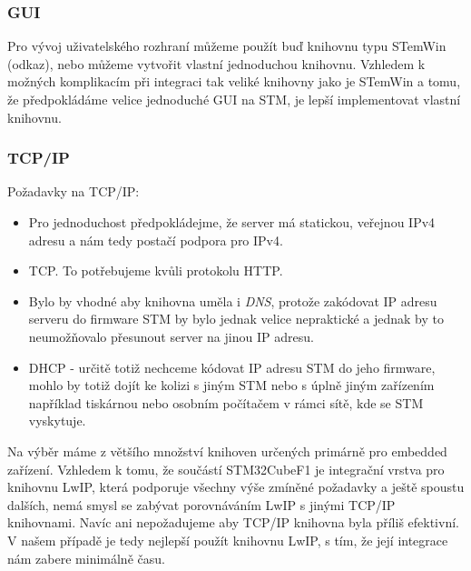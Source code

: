\subsubsection{GUI}
Pro vývoj uživatelského rozhraní můžeme použít buď knihovnu typu STemWin (odkaz), nebo můžeme
vytvořit vlastní jednoduchou knihovnu.
Vzhledem k možných komplikacím při integraci tak veliké knihovny jako je STemWin a tomu, že
předpokládáme velice jednoduché GUI na STM, je lepší implementovat vlastní knihovnu.

\subsubsection{TCP/IP}
Požadavky na TCP/IP:
\begin{itemize}
  \item Pro jednoduchost předpokládejme, že server má statickou, veřejnou IPv4 adresu a nám tedy
    postačí podpora pro IPv4.
  \item TCP. To potřebujeme kvůli protokolu HTTP.
  \item Bylo by vhodné aby knihovna uměla i \emph{DNS}, protože zakódovat IP adresu serveru do firmware
    STM by bylo jednak velice nepraktické a jednak by to neumožňovalo přesunout server na jinou
    IP adresu.
  \item DHCP - určitě totiž nechceme kódovat IP adresu STM do jeho firmware, mohlo by totiž dojít
    ke kolizi s jiným STM nebo s úplně jiným zařízením například tiskárnou nebo osobním počítačem
    v rámci sítě, kde se STM vyskytuje.
\end{itemize}
Na výběr máme z většího množství knihoven určených primárně pro embedded zařízení.
Vzhledem k tomu, že součástí STM32CubeF1 je integrační vrstva pro knihovnu LwIP, která podporuje
všechny výše zmíněné požadavky a ještě spoustu dalších, nemá smysl se zabývat porovnáváním LwIP
s jinými TCP/IP knihovnami.
Navíc ani nepožadujeme aby TCP/IP knihovna byla příliš efektivní.
V našem případě je tedy nejlepší použít knihovnu LwIP, s tím, že její integrace nám zabere minimálně
času.

